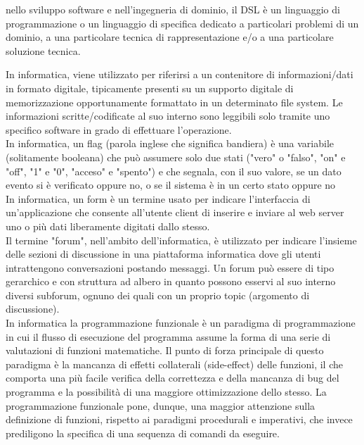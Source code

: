 \documentclass{scalatekids-article}
\begin{document}
 nello sviluppo software e nell'ingegneria di dominio, il DSL è un linguaggio di programmazione o un linguaggio di specifica dedicato a particolari problemi di un dominio, a una particolare tecnica di rappresentazione e/o a una particolare soluzione tecnica.
\\



 In informatica, viene utilizzato per riferirsi a un contenitore di informazioni/dati in formato digitale, tipicamente presenti su un supporto digitale di memorizzazione opportunamente formattato in un determinato file system.
Le informazioni scritte/codificate al suo interno sono leggibili solo tramite uno specifico software in grado di effettuare l'operazione.
\\

 In informatica, un flag (parola inglese che significa bandiera) è una variabile (solitamente booleana) che può assumere solo due stati ("vero" o "falso", "on" e "off", "1" e "0", "acceso" e "spento") e che segnala, con il suo valore, se un dato evento si è verificato oppure no, o se il sistema è in un certo stato oppure no
\\

 In informatica, un form è un termine usato per indicare l'interfaccia di un'applicazione che consente all'utente client di inserire e inviare al web server uno o più dati liberamente digitati dallo stesso.
\\

 Il termine "forum", nell'ambito dell'informatica, è utilizzato per indicare l'insieme delle sezioni di discussione in una piattaforma informatica dove gli utenti intrattengono conversazioni postando messaggi.
Un forum può essere di tipo gerarchico e con struttura ad albero in quanto possono esservi al suo interno diversi subforum, ognuno dei quali con un proprio topic (argomento di discussione).
\\

 In informatica la programmazione funzionale è un paradigma di programmazione in cui il flusso di esecuzione del programma assume la forma di una serie di valutazioni di funzioni matematiche. Il punto di forza principale di questo paradigma è la mancanza di effetti collaterali (side-effect) delle funzioni, il che comporta una più facile verifica della correttezza e della mancanza di bug del programma e la possibilità di una maggiore ottimizzazione dello stesso.
  La programmazione funzionale pone, dunque, una maggior attenzione sulla definizione di funzioni, rispetto ai paradigmi procedurali e imperativi, che invece prediligono la specifica di una sequenza di comandi da eseguire.
  \\
\\
\end{document}
